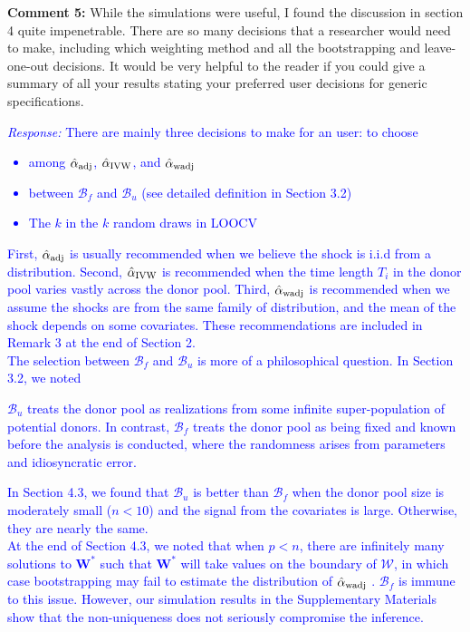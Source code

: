 \documentclass[12pt]{article}
\newcommand{\response}[1]{\noindent \textcolor{blue}{\emph{Response:} #1}}
\begin{document}
{\bf Comment 5:} While the simulations were useful, I found the discussion in section 4 quite impenetrable. There are so many decisions that a researcher would need to make, including which weighting method and all the bootstrapping and leave-one-out decisions. It would be very helpful to the reader if you could give a summary of all your results stating your preferred user decisions for generic specifications. \\

\response{There are mainly three decisions to make for an user: to choose 
  \begin{itemize}
    \item among  $\hat{\alpha}_{\rm adj}$, $\hat{\alpha}_{\rm IVW}$, and $\hat{\alpha}_{\rm wadj}$ 
    \item between $\mathcal{B}_f$ and $\mathcal{B}_u$ (see detailed definition in Section 3.2)
    \item The $k$ in the $k$ random draws in LOOCV
  \end{itemize}
  First, $\hat{\alpha}_{\rm adj}$ is usually recommended when we believe the shock is i.i.d from a distribution. Second, $\hat{\alpha}_{\rm IVW}$ is recommended when the time length $T_i$ in the donor pool varies vastly across the donor pool. Third, $\hat{\alpha}_{\rm wadj}$  is recommended when we assume the shocks are from the same family of distribution, and the mean of the shock depends on some covariates. These recommendations are included in Remark 3 at the end of Section 2. \\
  
  The selection between $\mathcal{B}_f$ and $\mathcal{B}_u$ is more of a philosophical question. In Section 3.2,  we noted
  
  \begin{tcolorbox}
  $\mathcal{B}_u$ treats the donor pool as realizations from some infinite super-population of potential donors. In contrast, $\mathcal{B}_f$ treats the donor pool as being fixed  and known before the analysis is conducted, where the randomness arises from parameters and idiosyncratic error.   
  \end{tcolorbox}

In Section 4.3, we found that $\mathcal{B}_u$ is better than $\mathcal{B}_f$ when  the donor pool size is moderately small ($n< 10$) and the signal from the covariates is large. Otherwise, they are nearly the same. \\


At the end of Section 4.3, we noted that when $p < n$, there are infinitely many solutions to $\mathbf{W}^*$ such that $\mathbf{W}^*$ will take values on the boundary of $\mathcal{W}$, in which case bootstrapping may fail to estimate the distribution of $\hat{\alpha}_{\rm wadj}$ \citep{andrews2000inconsistency}. $\mathcal{B}_f$  is immune to this issue. However, our simulation results in the Supplementary Materials show that the non-uniqueness does not seriously compromise the inference. \\



}
\end{document}
